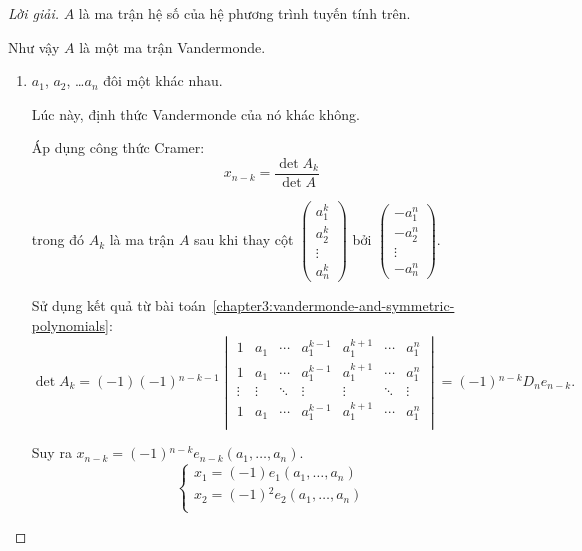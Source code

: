 \documentclass[class=nhvh-linear-algebra,crop=false]{standalone}
\begin{document}
\begin{proof}[Lời giải]
	\par $A$ là ma trận hệ số của hệ phương trình tuyến tính trên.
	\par Như vậy $A$ là một ma trận Vandermonde.

	\begin{enumerate}[label = \textbf{Trường hợp \arabic*.},itemindent=2cm]
		\item $a_{1}$, $a_{2}$, \ldots $a_{n}$ đôi một khác nhau.
		      \par Lúc này, định thức Vandermonde của nó khác không.
		      \par Áp dụng công thức Cramer:
		      \[
			      x_{n-k} = \dfrac{\det A_{k}}{\det A}
		      \]
		      \par trong đó $A_{k}$ là ma trận $A$ sau khi thay cột $\begin{pmatrix} a_{1}^{k} \\ a_{2}^{k} \\ \vdots \\ a_{n}^{k} \end{pmatrix}$ bởi $\begin{pmatrix}-a_{1}^{n} \\ -a_{2}^{n} \\ \vdots \\ -a_{n}^{n} \end{pmatrix}$.
		      \par Sử dụng kết quả từ bài toán~\ref{chapter3:vandermonde-and-symmetric-polynomials}:
		      \[
			      \det A_{k} = (-1)(-1){}^{n-k-1}
			      \begin{vmatrix}
				      1      & a_{1}  & \cdots & a_{1}^{k-1} & a_{1}^{k+1} & \cdots & a_{1}^{n} \\
				      1      & a_{1}  & \cdots & a_{1}^{k-1} & a_{1}^{k+1} & \cdots & a_{1}^{n} \\
				      \vdots & \vdots & \ddots & \vdots      & \vdots      & \ddots & \vdots    \\
				      1      & a_{1}  & \cdots & a_{1}^{k-1} & a_{1}^{k+1} & \cdots & a_{1}^{n} \\
			      \end{vmatrix}
			      = (-1){}^{n-k}D_{n}e_{n-k}.
		      \]
		      \par Suy ra $x_{n-k} = (-1){}^{n-k}e_{n-k}(a_{1},\ldots, a_{n})$.
		      \[
			      \begin{cases}
				      x_{1} = (-1)e_{1}(a_{1},\ldots,a_{n})       \\
				      x_{2} = (-1){}^{2}e_{2}(a_{1},\ldots,a_{n}) \\

\end{cases}\]
\end{enumerate}
\end{proof}
\end{document}
